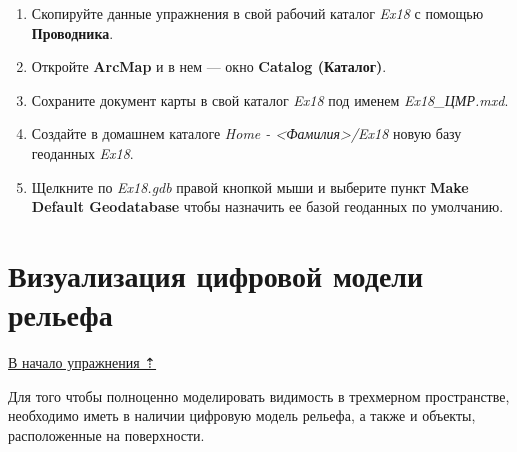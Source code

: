 \documentclass[]{book}
\theoremstyle{definition}
\theoremstyle{definition}
\theoremstyle{definition}
\theoremstyle{remark}
\begin{document}
\begin{enumerate}
\def\labelenumi{\arabic{enumi}.}
\item
  Скопируйте данные упражнения в свой рабочий каталог \emph{Ex18} с
  помощью \textbf{Проводника}.
\item
  Откройте \textbf{ArcMap} и в нем --- окно \textbf{Catalog (Каталог)}.
\item
  Сохраните документ карты в свой каталог \emph{Ex18} под именем
  \emph{Ex18\_ЦМР.mxd}.
\item
  Создайте в домашнем каталоге \emph{Home -
  \textless{}Фамилия\textgreater{}/Ex18} новую базу геоданных
  \emph{Ex18}.
\item
  Щелкните по \emph{Ex18.gdb} правой кнопкой мыши и выберите пункт
  \textbf{Make Default Geodatabase} чтобы назначить ее базой геоданных
  по умолчанию.
\end{enumerate}

\hypertarget{threed-modelling-demviz}{%
\section{Визуализация цифровой модели
рельефа}\label{threed-modelling-demviz}}

\protect\hyperlink{three-modelling}{В начало упражнения ⇡}

Для того чтобы полноценно моделировать видимость в трехмерном
пространстве, необходимо иметь в наличии цифровую модель рельефа, а
также и объекты, расположенные на поверхности.
\end{document}
